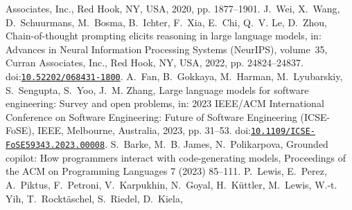 \documentclass[10pt,a4paper]{article}
\providecommand{\bibinfo}[2]{#2}
\providecommand{\DOIprefix}{doi:}
\providecommand{\doi}[1]{\href{https://doi.org/#1}{\nolinkurl{#1}}}
\begin{document}
\begin{thebibliography}{24}
{  Associates, Inc.}, \bibinfo{address}{Red Hook, NY, USA},
  \bibinfo{year}{2020}, pp. \bibinfo{pages}{1877--1901}.
\bibinfo{author}{J.~Wei}, \bibinfo{author}{X.~Wang},
  \bibinfo{author}{D.~Schuurmans}, \bibinfo{author}{M.~Bosma},
  \bibinfo{author}{B.~Ichter}, \bibinfo{author}{F.~Xia},
  \bibinfo{author}{E.~Chi}, \bibinfo{author}{Q.~V. Le},
  \bibinfo{author}{D.~Zhou},
\newblock \bibinfo{title}{Chain-of-thought prompting elicits reasoning in large
  language models},
\newblock in: \bibinfo{booktitle}{Advances in Neural Information Processing
  Systems (NeurIPS)}, volume~\bibinfo{volume}{35}, \bibinfo{publisher}{Curran
  Associates, Inc.}, \bibinfo{address}{Red Hook, NY, USA},
  \bibinfo{year}{2022}, pp. \bibinfo{pages}{24824--24837}.
  \DOIprefix\doi{10.52202/068431-1800}.
\bibinfo{author}{A.~Fan}, \bibinfo{author}{B.~Gokkaya},
  \bibinfo{author}{M.~Harman}, \bibinfo{author}{M.~Lyubarskiy},
  \bibinfo{author}{S.~Sengupta}, \bibinfo{author}{S.~Yoo},
  \bibinfo{author}{J.~M. Zhang},
\newblock \bibinfo{title}{Large language models for software engineering:
  Survey and open problems},
\newblock in: \bibinfo{booktitle}{2023 IEEE/ACM International Conference on
  Software Engineering: Future of Software Engineering (ICSE-FoSE)},
  \bibinfo{publisher}{IEEE}, \bibinfo{address}{Melbourne, Australia},
  \bibinfo{year}{2023}, pp. \bibinfo{pages}{31--53}.
  \DOIprefix\doi{10.1109/ICSE-FoSE59343.2023.00008}.
\bibinfo{author}{S.~Barke}, \bibinfo{author}{M.~B. James},
  \bibinfo{author}{N.~Polikarpova},
\newblock \bibinfo{title}{Grounded copilot: How programmers interact with
  code-generating models},
\newblock \bibinfo{journal}{Proceedings of the ACM on Programming Languages}
  \bibinfo{volume}{7} (\bibinfo{year}{2023}) \bibinfo{pages}{85--111}.
\bibinfo{author}{P.~Lewis}, \bibinfo{author}{E.~Perez},
  \bibinfo{author}{A.~Piktus}, \bibinfo{author}{F.~Petroni},
  \bibinfo{author}{V.~Karpukhin}, \bibinfo{author}{N.~Goyal},
  \bibinfo{author}{H.~K{\"u}ttler}, \bibinfo{author}{M.~Lewis},
  \bibinfo{author}{W.-t. Yih}, \bibinfo{author}{T.~Rockt{\"a}schel},
  \bibinfo{author}{S.~Riedel}, \bibinfo{author}{D.~Kiela},

\end{thebibliography}
\end{document}
